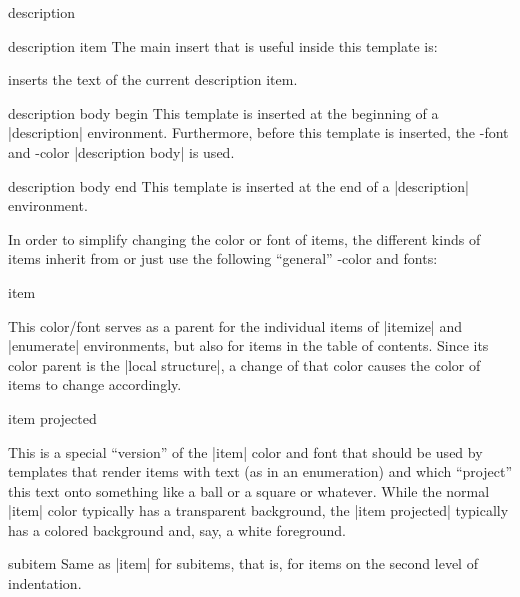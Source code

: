 \begin{environment}{{description}}
\begin{element}{description item}
    The main insert that is useful inside this template is:
    \begin{templateinserts}
      \iteminsert{\insertdescriptionitem} inserts the text of the current description item.
    \end{templateinserts}
  \end{element}

  \begin{element}{description body begin}\yes\no\no
    This template is inserted at the beginning of a |description| environment. Furthermore, before this template is inserted, the \beamer-font and -color |description body| is used.
  \end{element}

  \begin{element}{description body end}\yes\no\no
    This template is inserted at the end of a |description| environment.
  \end{element}
\end{environment}

In order to simplify changing the color or font of items, the different kinds of items inherit from or just use the following ``general'' \beamer-color and fonts:

\begin{element}{item}\no\yes\yes

  This color/font serves as a parent for the individual items of |itemize| and |enumerate| environments, but also for items in the table of contents. Since its color parent is the |local structure|, a change of that color causes the color of items to change accordingly.
\end{element}

\begin{element}{item projected}\no\yes\yes

  This is a special ``version'' of the |item| color and font that should be used by templates that render items with text (as in an enumeration) and which ``project'' this text onto something like a ball or a square or whatever. While the normal |item| color typically has a transparent background, the |item projected| typically has a colored background and, say, a white foreground.
\end{element}

\begin{element}{subitem}\no\yes\yes
  Same as |item| for subitems, that is, for items on the second level of indentation.
\end{element}

